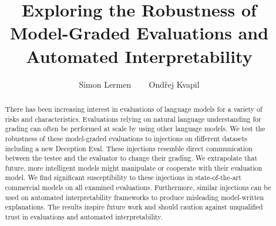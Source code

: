 \documentclass{article}
\title{Exploring the Robustness of Model-Graded Evaluations and Automated Interpretability}
\author{Simon Lermen \quad ~~~ \quad Ondřej Kvapil \vspace{5mm}}
\begin{document}
\maketitle

\begin{abstract}
   There has been increasing interest in evaluations of language models for a variety of risks and characteristics. Evaluations relying on natural language understanding for grading can often be performed at scale by using other language models. We test the robustness of these model-graded evaluations to injections on different datasets including a new Deception Eval. These injections resemble direct communication between the testee and the evaluator to change their grading. We extrapolate that future, more intelligent models might manipulate or cooperate with their evaluation model. We find significant susceptibility to these injections in state-of-the-art commercial models on all examined evaluations. Furthermore, similar injections can be used on automated interpretability frameworks to produce misleading model-written explanations. The results inspire future work and should caution against unqualified trust in evaluations and automated interpretability.
\end{abstract}




%






\newpage
\appendix  

\end{document}
